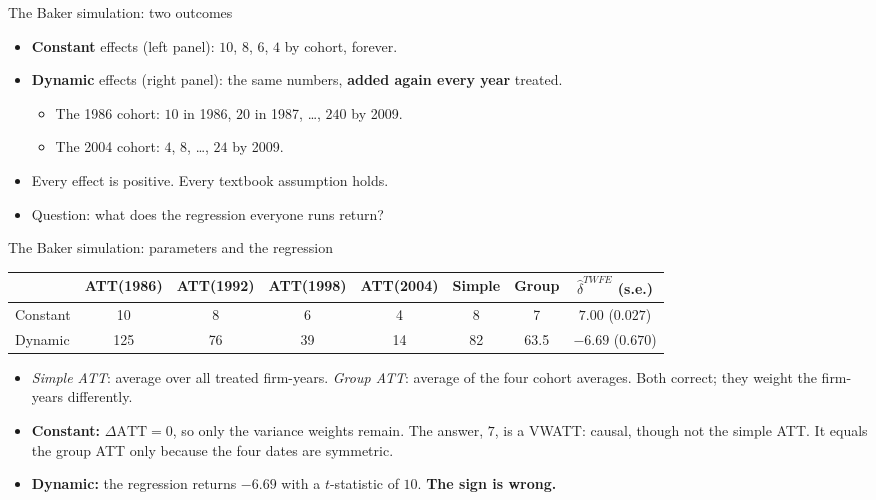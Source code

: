 \documentclass[
  11pt,
  ignorenonframetext,
  aspectratio=169,
]{beamer}
\providecommand{\tightlist}{%
  \setlength{\itemsep}{0pt}\setlength{\parskip}{0pt}}
\begin{document}
\begin{frame}{The Baker simulation: two outcomes}
\protect{}\label{the-baker-simulation-two-outcomes}
\begin{itemize}
\tightlist
\item
  \textbf{Constant} effects (left panel): \(10\), \(8\), \(6\), \(4\) by
  cohort, forever.
\item
  \textbf{Dynamic} effects (right panel): the same numbers,
  \textbf{added again every year} treated.

  \begin{itemize}
  \tightlist
  \item
    The 1986 cohort: \(10\) in 1986, \(20\) in 1987, \ldots, \(240\) by
    2009.
  \item
    The 2004 cohort: \(4\), \(8\), \ldots, \(24\) by 2009.
  \end{itemize}
\end{itemize}

\vspace{0.4em}

\begin{itemize}
\tightlist
\item
  Every effect is positive. Every textbook assumption holds.
\item
  Question: what does the regression everyone runs return?
\end{itemize}
\end{frame}

\begin{frame}{The Baker simulation: parameters and the regression}
\protect{}\label{the-baker-simulation-parameters-and-the-regression}
\begin{center}\scriptsize
\begin{tabular}{lcccccc|c}
\toprule
 & ATT(1986) & ATT(1992) & ATT(1998) & ATT(2004) & Simple & Group & $\hat\delta^{TWFE}$ (s.e.) \\
\midrule
Constant & 10 & 8 & 6 & 4 & 8 & 7 & $7.00$ ($0.027$) \\
Dynamic & 125 & 76 & 39 & 14 & 82 & 63.5 & $\mathbf{-6.69}$ ($0.670$) \\
\bottomrule
\end{tabular}
\end{center}

\begin{itemize}
\tightlist
\item
  \emph{Simple ATT}: average over all treated firm-years. \emph{Group
  ATT}: average of the four cohort averages. Both correct; they weight
  the firm-years differently.
\item
  \textbf{Constant:} \(\Delta\text{ATT} = 0\), so only the variance
  weights remain. The answer, \(7\), is a VWATT: causal, though not the
  simple ATT. It equals the group ATT only because the four dates are
  symmetric.
\item
  \textbf{Dynamic:} the regression returns \(\mathbf{-6.69}\) with a
  \(t\)-statistic of \(10\). \textbf{The sign is wrong.}
\end{itemize}
\end{frame}
\end{document}
